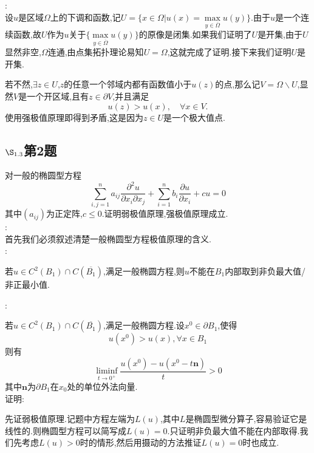 \documentclass[12pt, a4paper]{ctexbook}
\begin{document}
    \songti{}:\\
    
    设$u$是区域$\Omega$上的下调和函数,记$U = \{x \in \Omega | u(x) = \max\limits_{y \in \overline{\Omega}}u(y)\}$.由于$u$是一个连续函数,故$U$作为$u$关于$\{\max\limits_{y \in \overline{\Omega}}u(y)\}$的原像是闭集.如果我们证明了$U$是开集,由于$U$显然非空,$\Omega$连通,由点集拓扑理论易知$U=\Omega$,这就完成了证明.接下来我们证明$U$是开集.
    
    若不然,$\exists z \in U$,$z$的任意一个邻域内都有函数值小于$u(z)$的点,那么记$V = \Omega \backslash U$,显然$V$是一个开区域,且有$z \in \partial V$,并且满足
    \begin{equation*}
    u(z) > u(x) , \quad \forall x \in V.
    \end{equation*}
    使用强极值原理即得到矛盾,这是因为$z \in U$是一个极大值点.
    
    \subsection{$\S_{1.3}$第2题}
    \kaishu{}
    对一般的椭圆型方程$$
    \sum_{i,j=1}^{n}a_{ij}\frac{\partial^2 u}{\partial x_i \partial x_j}+\sum_{i=1}^{n}b_i \frac{\partial u}{\partial x_i}+cu=0$$
    其中$(a_{ij})$为正定阵,$c\le 0$.证明弱极值原理,强极值原理成立.\\
    
    \songti{}:\\
    
    首先我们必须叙述清楚一般椭圆型方程极值原理的含义.\\
    
    :
    
    若$u\in C^2(B_1) \cap C(\overline{B_1})$,满足一般椭圆方程,则$u$不能在$B_1$内部取到非负最大值/非正最小值.
    
    :
    
    若$u\in C^2(B_1) \cap C(\overline{B_1})$,满足一般椭圆方程.设$x^0\in \partial B_1$,使得$$
    u(x^0)>u(x),\forall x \in B_1$$
    则有$$
    \liminf_{t \to 0^+} \frac{u(x^0)-u(x^0-t\bm{n})}{t} >0 $$
    其中$\bm{n}$为$\partial B_1$在$x_0$处的单位外法向量.\\
    
    证明:
    
    先证弱极值原理.记题中方程左端为$L(u)$,其中$L$是椭圆型微分算子,容易验证它是线性的.则椭圆型方程可以简写成$L(u)=0$.只证明非负最大值不能在内部取得.我们先考虑$L(u)>0$时的情形,然后用摄动的方法推证$L(u)=0$时也成立.
    
\end{document}
